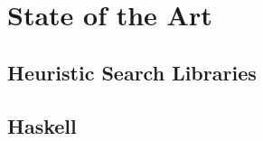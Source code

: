 \section{State of the Art}

\subsection{Heuristic Search Libraries}


\subsection{Haskell}

\newpage